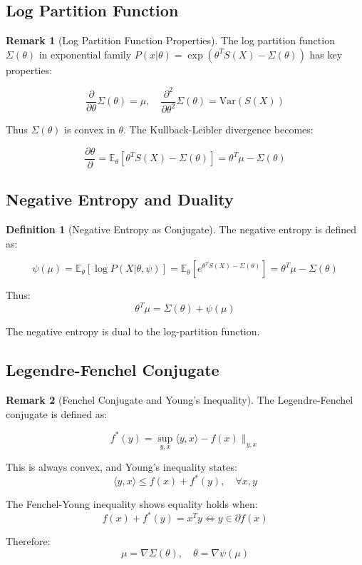 \documentclass[12pt,a4paper]{article}
\theoremstyle{definition}
\newtheorem{definition}{Definition}[section]
\newtheorem{remark}{Remark}[section]
\begin{document}
\subsection{Log Partition Function}

\begin{remark}[Log Partition Function Properties]
The log partition function $\Sigma(\theta)$ in exponential family $P(x|\theta) = \exp(\theta^T S(X) - \Sigma(\theta))$ has key properties:

\[
\frac{\partial}{\partial \theta} \Sigma(\theta) = \mu, \quad \frac{\partial^2}{\partial \theta^2} \Sigma(\theta) = \text{Var}(S(X))
\]

Thus $\Sigma(\theta)$ is convex in $\theta$. The Kullback-Leibler divergence becomes:

\[
\frac{\partial \theta}{\partial} = \mathbb{E}_\theta[\theta^T S(X) - \Sigma(\theta)] = \theta^T \mu - \Sigma(\theta)
\]
\end{remark}

\subsection{Negative Entropy and Duality}

\begin{definition}[Negative Entropy as Conjugate]
The negative entropy is defined as:

\[
\psi(\mu) = \mathbb{E}_\theta[\log P(X|\theta, \psi)] = \mathbb{E}_\theta[e^{\theta^T S(X) - \Sigma(\theta)}] = \theta^T \mu - \Sigma(\theta)
\]

Thus:
\[
\theta^T \mu = \Sigma(\theta) + \psi(\mu)
\]

The negative entropy is dual to the log-partition function.
\end{definition}

\subsection{Legendre-Fenchel Conjugate}

\begin{remark}[Fenchel Conjugate and Young's Inequality]
The Legendre-Fenchel conjugate is defined as:

\[
f^*(y) = \sup_{y, x} \langle y, x \rangle - f(x) \|_{y,x}
\]

This is always convex, and Young's inequality states:
\[
\langle y, x \rangle \leq f(x) + f^*(y), \quad \forall x, y
\]

The Fenchel-Young inequality shows equality holds when:
\[
f(x) + f^*(y) = x^T y \Longleftrightarrow y \in \partial f(x)
\]

Therefore:
\[
\mu = \nabla \Sigma(\theta), \quad \theta = \nabla \psi(\mu)
\]
\end{remark}
\end{document}
